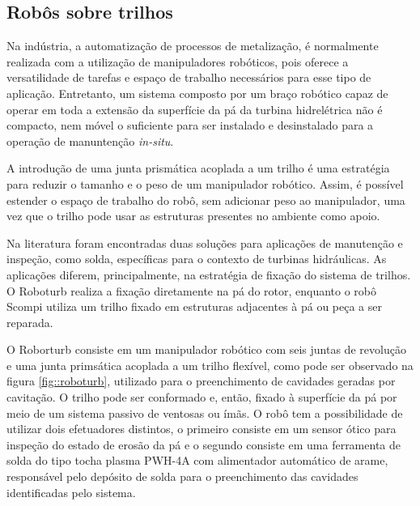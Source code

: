 \subsection{Robôs sobre trilhos}
\label{sec::rail}
Na indústria, a automatização de processos de metalização, é
normalmente realizada com a utilização de manipuladores robóticos, pois oferece
a versatilidade de tarefas e espaço de trabalho necessários para esse
tipo de aplicação. Entretanto, um sistema composto por um braço robótico capaz
de operar em toda a extensão da superfície da pá da turbina hidrelétrica
não é compacto, nem móvel o suficiente para ser instalado e desinstalado para a
operação de manuntenção \textit{in-situ}.

A introdução de uma junta prismática acoplada a um trilho é uma estratégia para
reduzir o tamanho e o peso de um manipulador robótico.  Assim, é possível estender o
 espaço de trabalho do robô, sem adicionar peso ao manipulador, uma vez que o
 trilho pode usar as estruturas presentes no ambiente como apoio. 

Na literatura foram encontradas duas soluções para aplicações de manutenção e
inspeção, como solda, específicas para o contexto de turbinas hidráulicas. As
aplicações diferem, principalmente, na estratégia de fixação do sistema
de trilhos.
O Roboturb \citep{roboturb} realiza a fixação
diretamente na pá do rotor, enquanto o robô Scompi \citep{scompi} utiliza um
 trilho fixado em
estruturas adjacentes à pá ou peça a ser reparada.

O Roborturb consiste em um manipulador robótico com seis juntas de revolução e
uma junta primsática acoplada a um trilho flexível, como pode ser observado
na figura \ref{fig::roboturb}, utilizado para o preenchimento de cavidades
geradas por cavitação.
O trilho pode ser conformado e, então, fixado à superfície da pá por meio de um
 sistema passivo de ventosas ou ímãs. O robô tem a possibilidade de utilizar dois 
 efetuadores distintos, o primeiro consiste em um sensor ótico para inspeção do 
 estado de erosão da pá e o segundo consiste em uma ferramenta de solda do 
tipo tocha plasma PWH-4A com alimentador automático de arame, responsável pelo 
depósito de solda para o preenchimento das cavidades identificadas pelo sistema.



